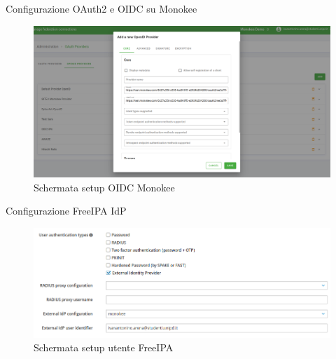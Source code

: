 \documentclass{beamer}
\begin{document}
	\begin{frame}{Configurazione OAuth2 e OIDC su Monokee}
		\begin{figure}[H] 
			\centering 
			\includegraphics[width=\columnwidth]{immagini/monokee-oidc.png} 
			\caption{Schermata setup OIDC Monokee}
			\label{fig:oidc-setup}
		\end{figure}
		
	\end{frame}
	
	\begin{frame}{Configurazione FreeIPA IdP}
		
		\begin{figure}[H] 
			\centering 
			\includegraphics[width=\columnwidth]{immagini/appendici/ipa-user.png} 
			\caption{Schermata setup utente FreeIPA}
			\label{fig:ipa-setup-user}
		\end{figure}
		
		
	\end{frame}
	
\end{document}
